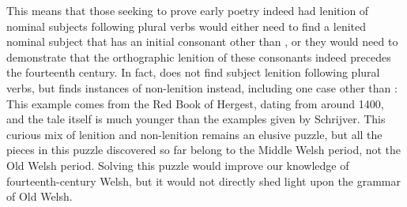 This means that those seeking to prove early poetry indeed had lenition of nominal subjects following plural verbs would either need to find a lenited nominal subject that has an initial consonant other than , or they would need to demonstrate that the orthographic lenition of these consonants indeed precedes the fourteenth century. In fact, \textcite[65--66]{van_development14} does not find subject lenition following plural verbs, but finds instances of non-lenition instead, including one case other than :
This example comes from the Red Book of Hergest, dating from around 1400, and the tale itself is much younger than the examples given by Schrijver. This curious mix of lenition and non-lenition remains an elusive puzzle, but all the pieces in this puzzle discovered so far belong to the Middle Welsh period, not the Old Welsh period. Solving this puzzle would improve our knowledge of fourteenth-century Welsh, but it would not directly shed light upon the grammar of Old Welsh.


